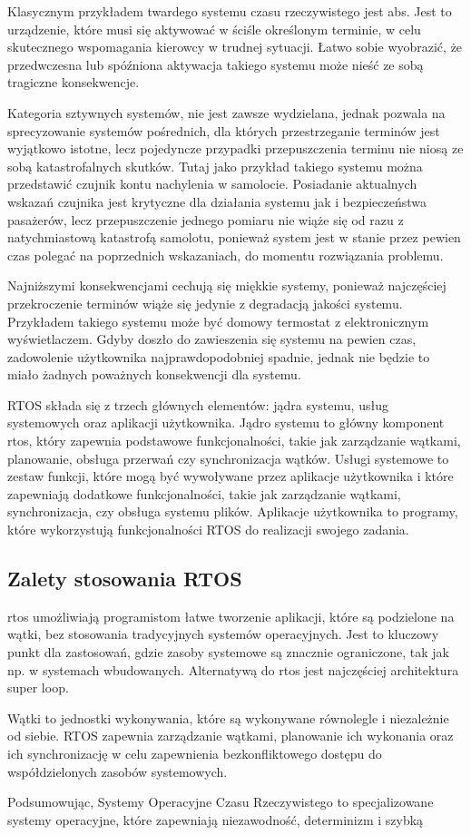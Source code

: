 Klasycznym przykładem twardego systemu czasu rzeczywistego jest \Gls{abs}.
Jest to urządzenie, które musi się aktywować w ściśle określonym terminie, w celu skutecznego wspomagania kierowcy w trudnej sytuacji. Łatwo sobie wyobrazić,
że przedwczesna lub spóźniona aktywacja takiego systemu może nieść ze sobą tragiczne konsekwencje.

Kategoria sztywnych systemów, nie jest zawsze wydzielana, jednak pozwala na sprecyzowanie systemów pośrednich, dla których przestrzeganie terminów jest
wyjątkowo istotne, lecz pojedyncze przypadki przepuszczenia terminu nie niosą ze sobą katastrofalnych skutków. Tutaj jako przykład takiego systemu można
przedstawić czujnik kontu nachylenia w samolocie. Posiadanie aktualnych wskazań czujnika jest krytyczne dla działania systemu jak i bezpieczeństwa pasażerów,
lecz przepuszczenie jednego pomiaru nie wiąże się od razu z natychmiastową katastrofą samolotu, ponieważ system jest w stanie przez pewien czas polegać
na poprzednich wskazaniach, do momentu rozwiązania problemu.

Najniższymi konsekwencjami cechują się miękkie systemy, ponieważ najczęściej przekroczenie terminów wiąże się jedynie z degradacją jakości systemu.
Przykładem takiego systemu może być domowy termostat z elektronicznym wyświetlaczem. Gdyby doszło do zawieszenia się systemu na pewien czas,
zadowolenie użytkownika najprawdopodobniej spadnie, jednak nie będzie to miało żadnych poważnych konsekwencji dla systemu.

RTOS składa się z trzech głównych elementów: jądra systemu, usług systemowych oraz aplikacji użytkownika.
Jądro systemu to główny komponent \gls{rtos}, który zapewnia podstawowe funkcjonalności, takie jak zarządzanie wątkami, planowanie, obsługa przerwań czy synchronizacja wątków.
Usługi systemowe to zestaw funkcji, które mogą być wywoływane przez aplikacje użytkownika i które zapewniają dodatkowe funkcjonalności,
takie jak zarządzanie wątkami, synchronizacja, czy obsługa systemu plików.
Aplikacje użytkownika to programy, które wykorzystują funkcjonalności RTOS do realizacji swojego zadania.

\subsection{Zalety stosowania RTOS}
\gls{rtos} umożliwiają programistom łatwe tworzenie aplikacji, które są podzielone na wątki, bez stosowania tradycyjnych systemów operacyjnych.
Jest to kluczowy punkt dla zastosowań, gdzie zasoby systemowe są znacznie ograniczone, tak jak np. w systemach wbudowanych.
Alternatywą do \gls{rtos} jest najczęściej architektura \gls{super loop}.



Wątki to jednostki wykonywania, które są wykonywane równolegle i niezależnie od siebie. RTOS zapewnia zarządzanie wątkami, planowanie ich wykonania oraz ich synchronizację w celu zapewnienia bezkonfliktowego dostępu do współdzielonych zasobów systemowych.

Podsumowując, Systemy Operacyjne Czasu Rzeczywistego to specjalizowane systemy operacyjne, które zapewniają niezawodność, determinizm i szybką